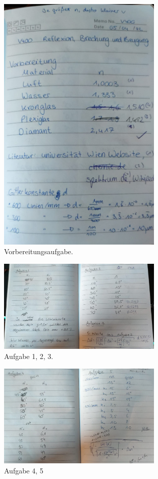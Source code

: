 \begin{figure}
  \centering
  \includegraphics[width=0.7\textwidth]{Messwerte/Vorbereitungsaufgabe.jpeg}
  \caption{Vorbereitungsaufgabe.}
  \label{fig:M1}
\end{figure}

\begin{figure}
  \centering
  \includegraphics[width=0.7\textwidth]{Messwerte/Aufgabe1,2,3.jpeg}
  \caption{Aufgabe 1, 2, 3.}
  \label{fig:M2}
\end{figure}

\begin{figure}
  \centering
  \includegraphics[width=0.7\textwidth]{Messwerte/Aufgabe4,5.jpeg}
  \caption{Aufgabe 4, 5}
  \label{fig:M3}
\end{figure}